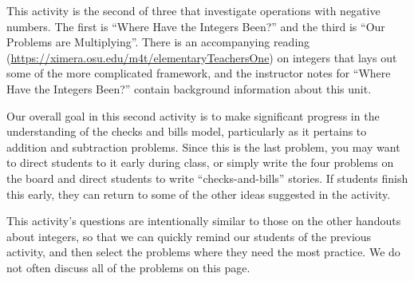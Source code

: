 \documentclass[nooutcomes,noauthor,handout]{ximera}
\begin{document}
\newpage
\begin{instructorNotes}
This activity is the second of three that investigate operations with negative numbers.  The first is ``Where Have the Integers Been?'' and the third is ``Our Problems are Multiplying''.  There is an accompanying reading (\url{https://ximera.osu.edu/m4t/elementaryTeachersOne}) on integers that lays out some of the more complicated framework, and the instructor notes for ``Where Have the Integers Been?'' contain background information about this unit.

Our overall goal in this second activity is to make significant progress in the understanding of the checks and bills model, particularly as it pertains to addition and subtraction problems. Since this is the last problem, you may want to direct students to it early during class, or simply write the four problems on the board and direct students to write ``checks-and-bills'' stories. If students finish this early, they can return to some of the other ideas suggested in the activity.

This activity's questions are intentionally similar to those on the other handouts about integers, so that we can quickly remind our students of the previous activity, and then select the problems where they need the most practice.  We do not often discuss all of the problems on this page.


\end{instructorNotes}
\end{document}
